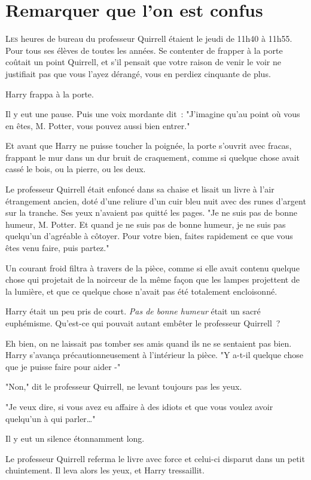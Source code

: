 \chapter{Remarquer que l'on est confus}

\lettrine{L}{es} heures de bureau du professeur Quirrell étaient le jeudi de 11h40 à 11h55. Pour tous ses élèves de toutes les années. Se contenter de frapper à la porte coûtait un point Quirrell, et s'il pensait que votre raison de venir le voir ne justifiait pas que vous l'ayez dérangé, vous en perdiez cinquante de plus.

Harry frappa à la porte.

Il y eut une pause. Puis une voix mordante dit~: "J'imagine qu'au point où vous en êtes, M. Potter, vous pouvez aussi bien entrer."

Et avant que Harry ne puisse toucher la poignée, la porte s'ouvrit avec fracas, frappant le mur dans un dur bruit de craquement, comme si quelque chose avait cassé le bois, ou la pierre, ou les deux.

Le professeur Quirrell était enfoncé dans sa chaise et lisait un livre à l'air étrangement ancien, doté d'une reliure d'un cuir bleu nuit avec des runes d'argent sur la tranche. Ses yeux n'avaient pas quitté les pages. "Je ne suis pas de bonne humeur, M. Potter. Et quand je ne suis pas de bonne humeur, je ne suis pas quelqu'un d'agréable à côtoyer. Pour votre bien, faites rapidement ce que vous êtes venu faire, puis partez."

Un courant froid filtra à travers de la pièce, comme si elle avait contenu quelque chose qui projetait de la noirceur de la même façon que les lampes projettent de la lumière, et que ce quelque chose n'avait pas été totalement encloisonné.

Harry était un peu pris de court. \emph{Pas de bonne humeur} était un sacré euphémisme. Qu'est-ce qui pouvait autant embêter le professeur Quirrell~?

Eh bien, on ne laissait pas tomber ses amis quand ils ne se sentaient pas bien. Harry s'avança précautionneusement à l'intérieur la pièce. "Y a-t-il quelque chose que je puisse faire pour aider -"

"Non," dit le professeur Quirrell, ne levant toujours pas les yeux.

"Je veux dire, si vous avez eu affaire à des idiots et que vous voulez avoir quelqu'un à qui parler…"

Il y eut un silence étonnamment long.

Le professeur Quirrell referma le livre avec force et celui-ci disparut dans un petit chuintement. Il leva alors les yeux, et Harry tressaillit.

